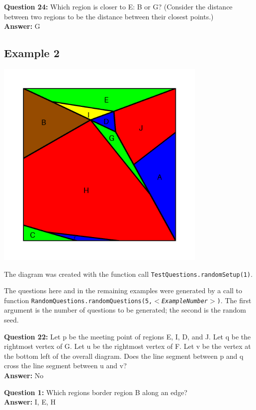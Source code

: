 \documentclass{article}    %
\begin{document}
{\bf Question 24:}
Which region is closer to E: B or G? (Consider the distance between two regions to be the distance between their closest points.) \\
{\bf Answer:}
G

\pagebreak

\subsection{Example 2}
\begin{center}
\includegraphics[height=4in]{Maps/RandomSetup1.png}
\end{center}

{\small  The diagram was created with the function 
call  {\tt TestQuestions.randomSetup(1)}.}

{\small The questions here and in the remaining examples were generated
by a call to function 
{\tt RandomQuestions.randomQuestions(5,$<${\it ExampleNumber}$>$)}.  The
first argument is the number of questions to be generated; the second is the
random seed.}

{\bf Question  22:} Let p be the meeting point of regions E, I, D, and J. Let q be the rightmost vertex of G. Let u be the rightmost vertex of F. Let v be the vertex at the bottom left of the overall diagram. Does the line segment between p and q cross the line segment between u and v? \\
{\bf Answer:}  No

{\bf Question  1:} Which regions border region B along an edge? \\
{\bf Answer:}  {I, E, H}
\end{document}
